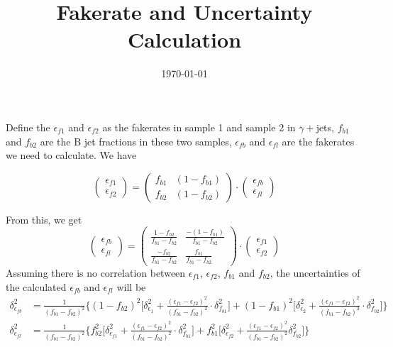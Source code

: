 \documentclass{article}
\title{Fakerate and Uncertainty Calculation}
\author{}
\date{\today{}}
\begin{document}
\maketitle

\begin{flushleft}

Define the $\epsilon_{f1}$ and $\epsilon_{f2}$ as the fakerates in sample 1 and sample 2 in $\gamma+$jets, $f_{b1}$ and $f_{b2}$ are the B jet fractions in these two samples, $\epsilon_{fb}$ and $\epsilon_{fl}$ are the fakerates we need to calculate. We have

\begin{equation}
\begin{pmatrix} \epsilon_{f1} \\ \epsilon_{f2} \end{pmatrix}=\begin{pmatrix} f_{b1} & (1-f_{b1}) \\ f_{b2} & (1-f_{b2}) \end{pmatrix}\cdot \begin{pmatrix}\epsilon_{fb} \\ \epsilon_{fl} \end{pmatrix} 
\end{equation}

From this, we get
\begin{equation}
\begin{pmatrix} \epsilon_{fb} \\ \epsilon_{fl} \end{pmatrix} = \begin{pmatrix} \frac{1-f_{b2}}{f_{b1}-f_{b2}} & \frac{-(1-f_{b1})}{f_{b1}-f_{b2}} \\ \frac{-f_{b2}}{f_{b1}-f_{b2}} & \frac{f_{b1}}{f_{b1}-f_{b2}}\end{pmatrix}\cdot \begin{pmatrix} \epsilon_{f1} \\ \epsilon_{f2} \end{pmatrix}
\end{equation}
Assuming there is no correlation between $\epsilon_{f1}$, $\epsilon_{f2}$, $f_{b1}$ and $f_{b2}$, the uncertainties of the calculated $\epsilon_{fb}$ and $\epsilon_{fl}$ will be
\begin{align*}
\delta^2_{\epsilon_{fb}}&=\frac{1}{(f_{b1}-f_{b2})^2}\Bigg\{(1-f_{b2})^2\bigg[\delta^2_{\epsilon_1}+\frac{(\epsilon_{f1}-\epsilon_{f2})^2}{(f_{b1}-f_{b2})^2}\cdot\delta^2_{f_{b1}}\bigg]+(1-f_{b1})^2\bigg[\delta^2_{\epsilon_2}+\frac{(\epsilon_{f1}-\epsilon_{f2})^2}{(f_{b1}-f_{b2})^2}\cdot\delta^2_{f_{b2}}\bigg]\Bigg\}\\
\delta^2_{\epsilon_{fl}}&=\frac{1}{(f_{b1}-f_{b2})^2}\Bigg\{f^2_{b2}\bigg[\delta^2_{\epsilon_{f1}}+\frac{(\epsilon_{f1}-\epsilon_{f2})^2}{(f_{b1}-f_{b2})^2}\cdot\delta^2_{f_{b1}}\bigg]+f^2_{b1}\bigg[\delta^2_{\epsilon_{f2}}+\frac{(\epsilon_{f1}-\epsilon_{f2})^2}{(f_{b1}-f_{b2})^2}\delta^2_{f_{b2}}\bigg]\Bigg\}
\end{align*}


\end{flushleft}
\end{document}

